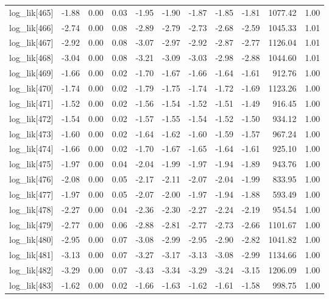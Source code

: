 \begin{table}[ht]
\begin{tabular}{rrrrrrrrrrr}
  log\_lik[465] & -1.88 & 0.00 & 0.03 & -1.95 & -1.90 & -1.87 & -1.85 & -1.81 & 1077.42 & 1.00 \\ 
  log\_lik[466] & -2.74 & 0.00 & 0.08 & -2.89 & -2.79 & -2.73 & -2.68 & -2.59 & 1045.33 & 1.01 \\ 
  log\_lik[467] & -2.92 & 0.00 & 0.08 & -3.07 & -2.97 & -2.92 & -2.87 & -2.77 & 1126.04 & 1.01 \\ 
  log\_lik[468] & -3.04 & 0.00 & 0.08 & -3.21 & -3.09 & -3.03 & -2.98 & -2.88 & 1044.60 & 1.01 \\ 
  log\_lik[469] & -1.66 & 0.00 & 0.02 & -1.70 & -1.67 & -1.66 & -1.64 & -1.61 & 912.76 & 1.00 \\ 
  log\_lik[470] & -1.74 & 0.00 & 0.02 & -1.79 & -1.75 & -1.74 & -1.72 & -1.69 & 1123.26 & 1.00 \\ 
  log\_lik[471] & -1.52 & 0.00 & 0.02 & -1.56 & -1.54 & -1.52 & -1.51 & -1.49 & 916.45 & 1.00 \\ 
  log\_lik[472] & -1.54 & 0.00 & 0.02 & -1.57 & -1.55 & -1.54 & -1.52 & -1.50 & 934.12 & 1.00 \\ 
  log\_lik[473] & -1.60 & 0.00 & 0.02 & -1.64 & -1.62 & -1.60 & -1.59 & -1.57 & 967.24 & 1.00 \\ 
  log\_lik[474] & -1.66 & 0.00 & 0.02 & -1.70 & -1.67 & -1.65 & -1.64 & -1.61 & 925.10 & 1.00 \\ 
  log\_lik[475] & -1.97 & 0.00 & 0.04 & -2.04 & -1.99 & -1.97 & -1.94 & -1.89 & 943.76 & 1.00 \\ 
  log\_lik[476] & -2.08 & 0.00 & 0.05 & -2.17 & -2.11 & -2.07 & -2.04 & -1.99 & 833.95 & 1.00 \\ 
  log\_lik[477] & -1.97 & 0.00 & 0.05 & -2.07 & -2.00 & -1.97 & -1.94 & -1.88 & 593.49 & 1.00 \\ 
  log\_lik[478] & -2.27 & 0.00 & 0.04 & -2.36 & -2.30 & -2.27 & -2.24 & -2.19 & 954.54 & 1.00 \\ 
  log\_lik[479] & -2.77 & 0.00 & 0.06 & -2.88 & -2.81 & -2.77 & -2.73 & -2.66 & 1101.67 & 1.00 \\ 
  log\_lik[480] & -2.95 & 0.00 & 0.07 & -3.08 & -2.99 & -2.95 & -2.90 & -2.82 & 1041.82 & 1.00 \\ 
  log\_lik[481] & -3.13 & 0.00 & 0.07 & -3.27 & -3.17 & -3.13 & -3.08 & -2.99 & 1134.66 & 1.00 \\ 
  log\_lik[482] & -3.29 & 0.00 & 0.07 & -3.43 & -3.34 & -3.29 & -3.24 & -3.15 & 1206.09 & 1.00 \\ 
  log\_lik[483] & -1.62 & 0.00 & 0.02 & -1.66 & -1.63 & -1.62 & -1.61 & -1.58 & 998.75 & 1.00 \\ 

\end{tabular}
\end{table}

